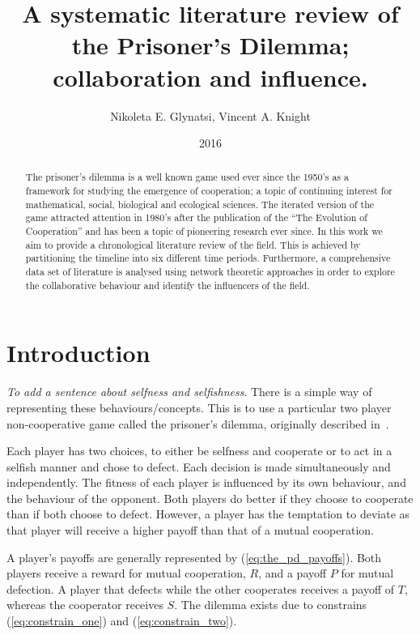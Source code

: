 \documentclass{article}
\title{A systematic literature review of the Prisoner's Dilemma; collaboration and influence.}
\author{Nikoleta E. Glynatsi, Vincent A. Knight}
\date{2016}
\theoremstyle{definition}
\begin{document}
\maketitle

\begin{abstract}
    The prisoner's dilemma is a well known game used ever since the 1950's as a framework
    for studying the emergence of cooperation; a topic of continuing interest
    for mathematical, social, biological and ecological sciences. The iterated version
    of the game attracted attention in 1980's after
    the publication of the ``The Evolution of Cooperation'' and has been a topic
    of pioneering research ever since. In this work we aim to provide a chronological
    literature review of the field. This is achieved by partitioning the timeline into six different
    time periods. Furthermore, a comprehensive data set of literature is analysed
    using network theoretic approaches in order to explore the collaborative
    behaviour and identify the influencers of the field.
\end{abstract}

\section{Introduction}\label{section:introduction}

\textit{To add a sentence about selfness and selfishness}. There is a simple
way of representing these behaviours/concepts. This is to use a
particular two player non-cooperative game called the prisoner's dilemma, originally
described in~\cite{Flood1958}.

Each player has two choices, to either be selfness and cooperate or to act in a
selfish manner and chose to defect. Each decision is made simultaneously and independently.
The fitness of each player is influenced by its own behaviour, and the behaviour
of the opponent. Both players do better if they choose to cooperate than if both
choose to defect. However, a player has the temptation to deviate as that player will
receive a higher payoff than that of a mutual cooperation.

A player's payoffs are generally represented by (\ref{eq:the_pd_payoffs}). Both
players receive a reward for mutual cooperation, \(R\), and a payoff \(P\) for
mutual defection. A player that defects while the other cooperates receives a payoff of
\(T\), whereas the cooperator receives \(S\). The dilemma exists due
to constrains (\ref{eq:constrain_one}) and (\ref{eq:constrain_two}).
\end{document}
